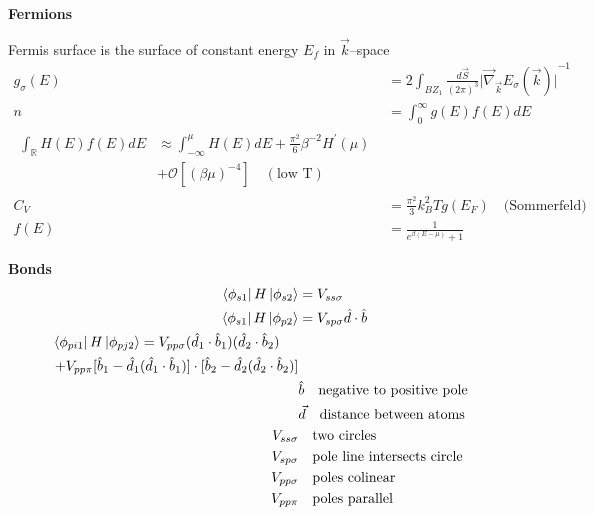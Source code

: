 \documentclass[12pt]{article}
\begin{document}
\begin{multicols}{2}
\noindent
\textbf{Fermions}

Fermis surface is the surface of constant energy $E_f$ in $\vec{k}$--space
\begin{align}
  g_{\sigma}(E) &= 2 \int_{BZ_1} \frac{d\vec{S}}{(2\pi)^3} {\lvert \vec{\nabla}_{\vec{k}} E_{\sigma}(\vec{k}) \rvert}^{-1}\\%
  n &= \int_0^{\infty}g(E)f(E)dE\\
  \begin{split}
    \int_{\mathbb{R}} H(E) f(E) dE &\approx \int_{-\infty}^{\mu} H(E) dE + \frac{\pi^2}{6} \beta^{-2} H^{\prime}(\mu)\\
    &+ \mathcal{O}[(\beta\mu)^{-4}] \quad (\textrm{low T})
  \end{split}\\
  C_{V} &= \frac{\pi^2}{3}k_B^2Tg(E_F) \quad \textrm{(Sommerfeld)}\\ %
  f(E) &= \frac{1}{e^{\beta(E-\mu)} + 1}
\end{align}

\noindent
\textbf{Bonds}
\begin{align}
  \bra*{\phi_{s1}} H \ket*{\phi_{s2}} &= V_{ss\sigma}\\
  \bra*{\phi_{s1}} H \ket*{\phi_{p2}} &= V_{sp\sigma} \hat{d} \cdot \hat{b}\\
  \begin{split}
    \bra*{\phi_{pi1}} H \ket*{\phi_{pj2}} &=
    V_{pp\sigma} (\hat{d}_1 \cdot \hat{b}_1) (\hat{d}_2 \cdot \hat{b}_2)\\
    + V_{pp\pi} [\hat{b}_1 - \hat{d}_1&(\hat{d}_1 \cdot \hat{b}_1)]
    \cdot [\hat{b}_2 - \hat{d}_2 (\hat{d}_2 \cdot \hat{b}_2)]
  \end{split}\\ %
  &\hat{b} \quad \textrm{negative to positive pole}\\
  &\vec{d} \quad \textrm{distance between atoms}\\
  V_{ss\sigma} & \quad \textrm{two circles}\\
  V_{sp\sigma} & \quad \textrm{pole line intersects circle}\\
  V_{pp\sigma} & \quad \textrm{poles colinear}\\
  V_{pp\pi} & \quad \textrm{poles parallel}
\end{align}


\end{multicols}
\end{document}

